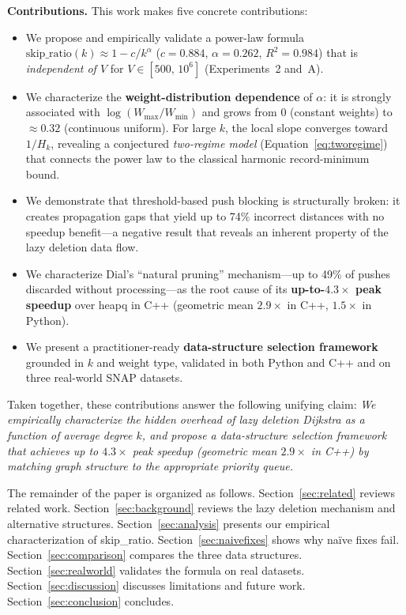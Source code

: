 \documentclass[conference]{IEEEtran}
\begin{document}
\noindent\textbf{Contributions.}  This work makes five concrete contributions:
\begin{itemize}
  \item We propose and empirically validate a power-law formula
        $\text{skip\_ratio}(k)\approx 1-c/k^{\alpha}$ ($c{=}0.884$,
        $\alpha{=}0.262$, $R^2{=}0.984$) that is \emph{independent of $V$}
        for $V\in[500,\,10^6]$ (Experiments~2 and~A).
  \item We characterize the \textbf{weight-distribution dependence} of
        $\alpha$: it is strongly associated with $\log(W_{\max}/W_{\min})$
        and grows from $0$ (constant weights) to ${\approx}0.32$
        (continuous uniform).  For large $k$, the local slope converges
        toward $1/H_k$, revealing a conjectured \emph{two-regime model}
        (Equation~\eqref{eq:tworegime}) that connects the power law to the
        classical harmonic record-minimum bound.
  \item We demonstrate that threshold-based push blocking is structurally
        broken: it creates propagation gaps that yield up to 74\%
        incorrect distances with no speedup benefit---a negative result that
        reveals an inherent property of the lazy deletion data flow.
  \item We characterize Dial's ``natural pruning'' mechanism---up to 49\%
        of pushes discarded without processing---as the root cause of its
        \textbf{up-to-$4.3\times$ peak speedup} over heapq in C++
        (geometric mean $2.9\times$ in C++, $1.5\times$ in Python).
  \item We present a practitioner-ready \textbf{data-structure selection
        framework} grounded in $k$ and weight type, validated in both Python
        and C++ and on three real-world SNAP datasets.
\end{itemize}

Taken together, these contributions answer the following unifying claim:
\emph{We empirically characterize the hidden overhead of lazy deletion
Dijkstra as a function of average degree $k$, and propose a data-structure
selection framework that achieves up to $4.3\times$ peak speedup
(geometric mean $2.9\times$ in C++) by matching graph structure to
the appropriate priority queue.}

\noindent The remainder of the paper is organized as follows.
Section~\ref{sec:related} reviews related work.
Section~\ref{sec:background} reviews the lazy deletion mechanism and
alternative structures.
Section~\ref{sec:analysis} presents our empirical characterization of
skip\_ratio.
Section~\ref{sec:naivefixes} shows why na\"ive fixes fail.
Section~\ref{sec:comparison} compares the three data structures.
Section~\ref{sec:realworld} validates the formula on real datasets.
Section~\ref{sec:discussion} discusses limitations and future work.
Section~\ref{sec:conclusion} concludes.
\end{document}
